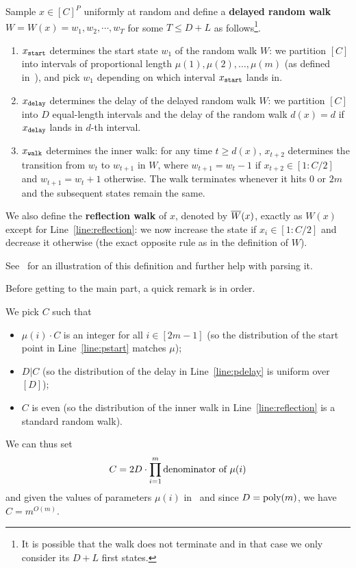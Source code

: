 \begin{definition}\label{def:W(x)}
Sample $x \in [C]^P$ uniformly at random and define a \textbf{delayed random walk} $W = W(x) = w_1,w_2,\cdots,w_T$ for some $T \leq D+L$ as follows\footnote{It is possible that the walk does not terminate and in that case we only consider its $D+L$ first states.}.
\begin{enumerate}[itemsep=3pt]
\item\label{line:pstart} $x_{\textnormal{\texttt{start}}}$ determines the start state $w_1$ of the random walk $W$: we partition $[C]$ into intervals of proportional length $\mu(1),\mu(2),\ldots,\mu(m)$ (as defined in~), 
and pick $w_1$ depending on which interval $x_{\textnormal{\texttt{start}}}$ lands in. 
\item\label{line:pdelay} $x_{\textnormal{\texttt{delay}}}$ determines the delay of the delayed random walk $W$: we partition $[C]$ into $D$ equal-length intervals and the delay of the random walk $d(x)=d$
if $x_{\textnormal{\texttt{delay}}}$ lands in $d$-th interval.  
\item\label{line:reflection} $x_{\textnormal{\texttt{walk}}}$ determines the inner walk: for any time $t \geq d(x)$, $x_{t+2}$ determines the transition from $w_t$ to $w_{t+1}$ in $W$, where
$w_{t+1} = w_t -1$ if $x_{t+2} \in [1:{C}/{2}]$ and $w_{t+1}=w_t + 1$ otherwise.
The walk terminates whenever it hits $0$ or $2m$ and the subsequent states remain the same. 
\end{enumerate}

We also define the \textbf{reflection walk} of $x$, denoted by $\overline{W}(x)$, exactly as $W(x)$ except for Line~\eqref{line:reflection}: we now increase the state if $x_i \in [1:C/2]$ and decrease it otherwise (the exact opposite rule as in the definition of $W$).  
\end{definition}
See~ for an illustration of this definition and further help with parsing it. 

\clearpage
Before getting to the main part, a quick remark is in order. 
\begin{remark}
We pick $C$ such that 
\begin{itemize}
	\item $\mu(i) \cdot C$ is an integer for all $i \in [2m-1]$ (so the distribution of the start point in Line~\eqref{line:pstart} 
	matches $\mu$);  
	\item $D | C$ (so the distribution of the delay in Line~\eqref{line:pdelay} is uniform over $[D]$); 
	\item $C$ is even (so the distribution of the inner walk in Line~\eqref{line:reflection} is a standard random walk).  
\end{itemize}
	We can thus set 
	\[
		C = 2D \cdot \prod_{i=1}^{m} \textnormal{denominator of $\mu(i)$}
	\]
	and given the values of parameters $\mu(i)$ in~ and since $D= \mbox{\rm poly}(m)$, we have $C=m^{O(m)}$. 
\end{remark}

